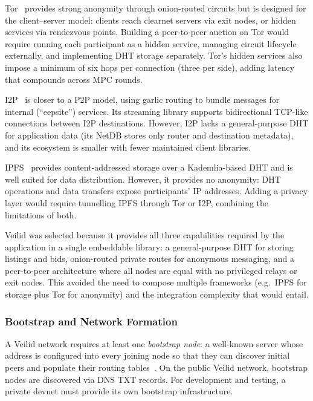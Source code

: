 Tor~\cite{dingledine2004_tor} provides strong anonymity through onion-routed
circuits but is designed for the client--server model: clients reach clearnet
servers via exit nodes, or hidden services via rendezvous points.  Building a
peer-to-peer auction on Tor would require running each participant as a hidden
service, managing circuit lifecycle externally, and implementing DHT storage
separately.  Tor's hidden services also impose a minimum of six hops per
connection (three per side), adding latency that compounds across MPC rounds.

I2P~\cite{zantout2011_i2p} is closer to a P2P model, using garlic routing to
bundle messages for internal (``eepsite'') services.  Its streaming library
supports bidirectional TCP-like connections between I2P destinations.  However,
I2P lacks a general-purpose DHT for application data (its NetDB stores only
router and destination metadata), and its ecosystem is smaller with fewer
maintained client libraries.

IPFS~\cite{benet2014_ipfs} provides content-addressed storage over a
Kademlia-based DHT and is well suited for data distribution.  However, it
provides no anonymity: DHT operations and data transfers expose participants'
IP addresses.  Adding a privacy layer would require tunnelling IPFS through Tor
or I2P, combining the limitations of both.

Veilid was selected because it provides all three capabilities required by the
application in a single embeddable library: a general-purpose DHT for
storing listings and bids, onion-routed private routes for anonymous messaging,
and a peer-to-peer architecture where all nodes are equal with no privileged
relays or exit nodes.  This avoided the need to compose multiple
frameworks (e.g.\ IPFS for storage plus Tor for anonymity) and the integration
complexity that would entail.

\subsubsection{Bootstrap and Network Formation}
\label{sec:ctx-veilid-bootstrap}

A Veilid network requires at least one \emph{bootstrap node}: a
well-known server whose address is configured into every joining node so
that they can discover initial peers and populate their routing
tables~\cite{veilid_bootstrap_setup}.  On the public Veilid network,
bootstrap nodes are discovered via DNS TXT records.  For development and
testing, a private devnet must provide its own bootstrap infrastructure.

